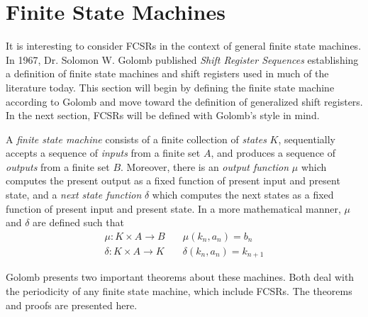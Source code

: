\section{Finite State Machines}
\par It is interesting to consider FCSRs in the context of general finite state
machines. In 1967, Dr. Solomon W. Golomb published {\em Shift Register Sequences}
establishing a definition of finite state machines and shift registers used in
much of the literature today. This section will begin by defining the finite state
machine according to Golomb and move toward the definition of generalized shift
registers. In the next section, FCSRs will be defined with Golomb's style in mind.

\begin{definition}\label{finite-state-machine}
  A {\em finite state machine} consists of a finite collection of {\em states}
  $K$, sequentially accepts a sequence of {\em inputs} from a finite set
  $A$, and produces a sequence of {\em outputs} from a finite set
  $B$. Moreover, there is an {\em output function} $\mu$ which computes
  the present output as a fixed function of present input and present state, and a
  {\em next state function} $\delta$ which computes the next states as a fixed
  function of present input and present state. In a more mathematical manner,
  $\mu$ and $\delta$ are defined such that
  \begin{eqnarray}
    \mu:K \times A \rightarrow B \quad &\mu(k_n,a_n)=b_n \\
    \delta:K \times A \rightarrow K \quad &\delta(k_n,a_n)=k_{n+1}
  \end{eqnarray}
\end{definition}


\par Golomb presents two important theorems about these machines. Both deal with
the periodicity of any finite state machine, which include FCSRs. The theorems
and proofs are presented here.


